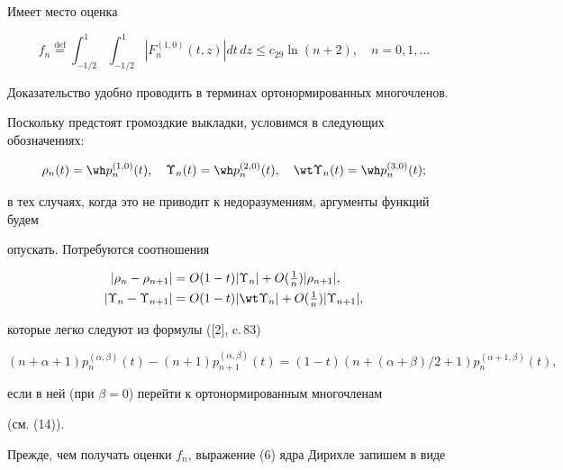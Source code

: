 \begin{lem} Имеет место оценка


$$


f_n \overset{\mathrm{def}}{={}} \int_{-{1}/{2}}^1 \int_{-{1}/{2}}^1


|F_n^{(1,0)}(t,z)|dt\, dz \le c_{29} \ln(n+2),\quad n=0,1,\dotsc


$$


\end{lem}





Доказательство удобно проводить в терминах ортонормированных многочленов.


Поскольку предстоят громоздкие выкладки, условимся в следующих обозначениях:


$$


\rho_n (t)=\wh p_n^{(1,0)}(t),\quad \Upsilon_n (t)=\wh p_n^{(2,0)}(t),


\quad \wt \Upsilon_n (t)=\wh p_n^{(3,0)}(t);


$$


в тех случаях, когда это не приводит к недоразумениям, аргументы функций будем


опускать. Потребуются соотношения


\begin{align}


|\rho_n-\rho_{n+1}|&= O(1-t)|\Upsilon_n|+O(\tfrac{1}{n})|\rho_{n+1}|, \\


%


|\Upsilon_n-\Upsilon_{n+1}|&= O(1-t)|\wt \Upsilon_n|+O(\tfrac{1}{n})


|\Upsilon_{n+1}|,


\end{align}


которые легко следуют из формулы ([2], c.\,83)


$$


(n+\alpha +1) p_n^{(\alpha,\beta)}(t) -(n+1) p_{n+1}^{(\alpha,\beta)}(t)


=(1-t)(n+ (\alpha +\beta)/{2}+1) p_n^{(\alpha +1,\beta)}(t),


$$


если в ней (при $\beta =0$) перейти к ортонормированным многочленам


(см. (14)).





Прежде, чем получать оценки $f_n$, выражение (6) ядра Дирихле запишем в виде


